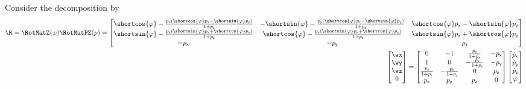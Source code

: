 Consider the decomposition by
\begin{align}
 \R = \RotMatZ(\varphi) \RotMatPZ(p) =
 \begin{bmatrix}
  \shortcos{\varphi} - \tfrac{p_\mathsf{x} (\shortcos{\varphi} p_\mathsf{x} - \shortsin{\varphi} p_\mathsf{y})}{1+p_\mathsf{z}} & -\shortsin{\varphi}- \tfrac{p_\mathsf{y} (\shortcos{\varphi} p_\mathsf{x} - \shortsin{\varphi} p_\mathsf{y})}{1+p_\mathsf{z}} & \shortcos{\varphi} p_\mathsf{x} - \shortsin{\varphi} p_\mathsf{y} \\
  \shortsin{\varphi} - \tfrac{p_\mathsf{x} (\shortsin{\varphi} p_\mathsf{x} + \shortcos{\varphi} p_\mathsf{y})}{1+p_\mathsf{z}} &  \shortcos{\varphi}- \tfrac{p_\mathsf{y} (\shortsin{\varphi} p_\mathsf{x} + \shortcos{\varphi} p_\mathsf{y})}{1+p_\mathsf{z}} & \shortsin{\varphi} p_\mathsf{x} + \shortcos{\varphi} p_\mathsf{y} \\
  -p_\mathsf{x} & -p_\mathsf{y} & p_\mathsf{z} \\
 \end{bmatrix}
\\
 \begin{bmatrix} \wx \\ \wy \\ \wz \\ 0 \end{bmatrix}
 =
 \begin{bmatrix}
  0 & -1 & \tfrac{p_\mathsf{y}}{1+p_\mathsf{z}} & -p_\mathsf{x} \\
  1 & 0 & -\tfrac{p_\mathsf{x}}{1+p_\mathsf{z}} & -p_\mathsf{y} \\
  \tfrac{p_\mathsf{y}}{1+p_\mathsf{z}} & -\tfrac{p_\mathsf{x}}{1+p_\mathsf{z}} & 0 & p_\mathsf{z} \\
  p_\mathsf{x} & p_\mathsf{y} & p_\mathsf{z} & 0 \\
 \end{bmatrix}
 \begin{bmatrix} \dot{p}_\mathsf{x} \\ \dot{p}_\mathsf{y} \\ \dot{p}_\mathsf{z} \\ \dot{\varphi} \end{bmatrix}
\end{align}

